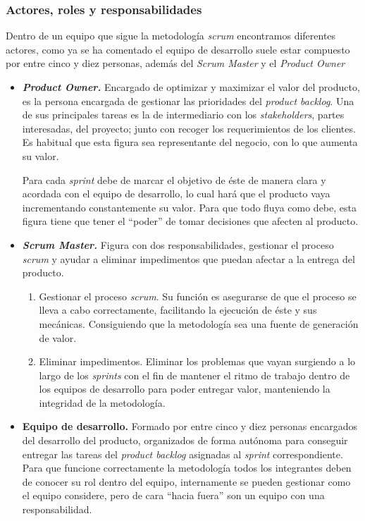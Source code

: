 \subsubsection{Actores, roles y responsabilidades}
Dentro de un equipo que sigue la metodología \textit{scrum} encontramos diferentes actores, como ya se ha comentado el equipo de desarrollo suele estar compuesto por entre cinco y diez personas, además del \textit{Scrum Master} y el \textit{Product Owner}~\cite{julioroche_2020}
\begin{itemize}
\item \textbf{\textit{Product Owner.}} Encargado de optimizar y maximizar el valor del producto, es la persona encargada de gestionar las prioridades del \textit{product backlog}. Una de sus principales tareas es la de intermediario con los \textit{stakeholders}, partes interesadas, del proyecto; junto con recoger los requerimientos de los clientes. Es habitual que esta figura sea representante del negocio, con lo que aumenta su valor.

Para cada \textit{sprint} debe de marcar el objetivo de éste de manera clara y acordada con el equipo de desarrollo, lo cual hará que el producto vaya incrementando constantemente su valor. Para que todo fluya como debe, esta figura tiene que tener el ``poder'' de tomar decisiones que afecten al producto.

\item \textbf{\textit{Scrum Master.}} Figura con dos responsabilidades, gestionar el proceso \textit{scrum} y ayudar a eliminar impedimentos que puedan afectar a la entrega del producto.
\begin{enumerate}
\item Gestionar el proceso \textit{scrum}. Su función es asegurarse de que el proceso se lleva a cabo correctamente, facilitando la ejecución de éste y sus mecánicas. Consiguiendo que la metodología sea una fuente de generación de valor.
\item Eliminar impedimentos. Eliminar los problemas que vayan surgiendo a lo largo de los \textit{sprints} con el fin de mantener el ritmo de trabajo dentro de los equipos de desarrollo para poder entregar valor, manteniendo la integridad de la metodología.
\end{enumerate}
\item \textbf{Equipo de desarrollo.} Formado por entre cinco y diez personas encargados del desarrollo del producto, organizados de forma autónoma para conseguir entregar las tareas del \textit{product backlog} asignadas al \textit{sprint} correspondiente. Para que funcione correctamente la metodología todos los integrantes deben de conocer su rol dentro del equipo, internamente se pueden gestionar como el equipo considere, pero de cara ``hacia fuera'' son un equipo con una responsabilidad.
\end{itemize}

